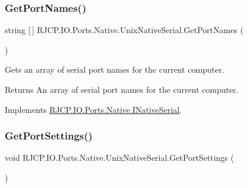 \mbox{\label{class_r_j_c_p_1_1_i_o_1_1_ports_1_1_native_1_1_unix_native_serial_a2d9ec0ba3ee965ceea81ba5268f6621b}} 
\subsubsection{\texorpdfstring{GetPortNames()}{GetPortNames()}}
{\footnotesize\ttfamily string \mbox{[}$\,$\mbox{]} R\+J\+C\+P.\+I\+O.\+Ports.\+Native.\+Unix\+Native\+Serial.\+Get\+Port\+Names (\begin{DoxyParamCaption}{ }\end{DoxyParamCaption})}



Gets an array of serial port names for the current computer. 

\begin{DoxyReturn}{Returns}
An array of serial port names for the current computer.
\end{DoxyReturn}


Implements \mbox{\hyperlink{interface_r_j_c_p_1_1_i_o_1_1_ports_1_1_native_1_1_i_native_serial_a5c29356160f31a94f992a9a023a78ff3}{R\+J\+C\+P.\+I\+O.\+Ports.\+Native.\+I\+Native\+Serial}}.

\mbox{\label{class_r_j_c_p_1_1_i_o_1_1_ports_1_1_native_1_1_unix_native_serial_afa18ebb0cdd696498f6aca9bef0a556d}} 
\subsubsection{\texorpdfstring{GetPortSettings()}{GetPortSettings()}}
{\footnotesize\ttfamily void R\+J\+C\+P.\+I\+O.\+Ports.\+Native.\+Unix\+Native\+Serial.\+Get\+Port\+Settings (\begin{DoxyParamCaption}{ }\end{DoxyParamCaption})}



